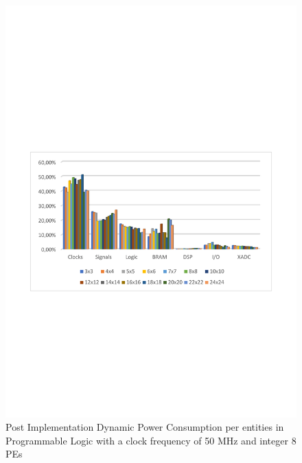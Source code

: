 \begin{figure}[!htbp]
\centering
\captionsetup{justification=centering}
\includegraphics[scale=0.7,angle=0]{./figure/graphs/power_pldyn_div_int8_freq_50mhz.pdf}
\caption{Post Implementation Dynamic Power Consumption per entities in Programmable Logic with a clock frequency of 50 MHz and integer 8 PEs}
\label{fig:dynpowint8ent50}
\end{figure}

